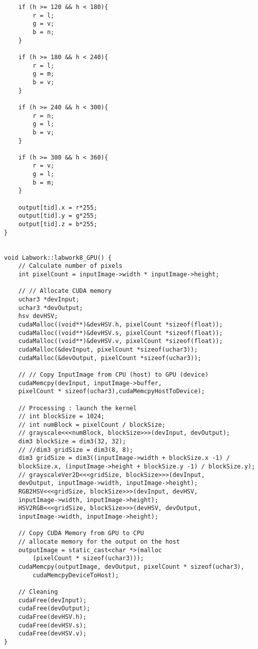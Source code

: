 \documentclass{article}
\begin{document}
\begin{enumerate}
\begin{verbatim}
    if (h >= 120 && h < 180){
        r = l;
        g = v;
        b = n;
    }

    if (h >= 180 && h < 240){
        r = l;
        g = m;
        b = v;
    }

    if (h >= 240 && h < 300){
        r = n;
        g = l;
        b = v;
    }

    if (h >= 300 && h < 360){
        r = v;
        g = l;
        b = m;
    }

    output[tid].x = r*255;
    output[tid].y = g*255;
    output[tid].z = b*255;
}


void Labwork::labwork8_GPU() {
    // Calculate number of pixels
    int pixelCount = inputImage->width * inputImage->height;

    // // Allocate CUDA memory
    uchar3 *devInput;
    uchar3 *devOutput;
    hsv devHSV;
    cudaMalloc((void**)&devHSV.h, pixelCount *sizeof(float));
    cudaMalloc((void**)&devHSV.s, pixelCount *sizeof(float));
    cudaMalloc((void**)&devHSV.v, pixelCount *sizeof(float));
    cudaMalloc(&devInput, pixelCount *sizeof(uchar3));
    cudaMalloc(&devOutput, pixelCount *sizeof(uchar3));

    // // Copy InputImage from CPU (host) to GPU (device)
    cudaMemcpy(devInput, inputImage->buffer, 
    pixelCount * sizeof(uchar3),cudaMemcpyHostToDevice);

    // Processing : launch the kernel
    // int blockSize = 1024;
    // int numBlock = pixelCount / blockSize;  
    // grayscale<<<numBlock, blockSize>>>(devInput, devOutput);
    dim3 blockSize = dim3(32, 32);
    // //dim3 gridSize = dim3(8, 8);
    dim3 gridSize = dim3((inputImage->width + blockSize.x -1) / 
    blockSize.x, (inputImage->height + blockSize.y -1) / blockSize.y);
    // grayscaleVer2D<<<gridSize, blockSize>>>(devInput, 
    devOutput, inputImage->width, inputImage->height);
    RGB2HSV<<<gridSize, blockSize>>>(devInput, devHSV, 
    inputImage->width, inputImage->height);
    HSV2RGB<<<gridSize, blockSize>>>(devHSV, devOutput, 
    inputImage->width, inputImage->height);

    // Copy CUDA Memory from GPU to CPU
    // allocate memory for the output on the host
    outputImage = static_cast<char *>(malloc
        (pixelCount * sizeof(uchar3)));  
    cudaMemcpy(outputImage, devOutput, pixelCount * sizeof(uchar3),
        cudaMemcpyDeviceToHost);

    // Cleaning
    cudaFree(devInput);
    cudaFree(devOutput);
    cudaFree(devHSV.h);
    cudaFree(devHSV.s);
    cudaFree(devHSV.v);    
}
\end{verbatim}

\end{enumerate}
\end{document}

